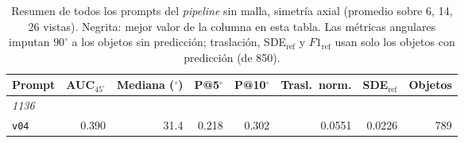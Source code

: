 
\begin{table}[htbp]
\centering
\caption{Resumen de todos los prompts del \textit{pipeline} sin malla, simetría axial (promedio sobre 6, 14, 26 vistas). Negrita: mejor valor de la columna en esta tabla. Las métricas angulares imputan $90^\circ$ a los objetos sin predicción; traslación, SDE$_{\mathrm{ref}}$ y $F1_{\mathrm{ref}}$ usan solo los objetos con predicción (de 850).}
\label{tab:axis_resumen}
\begin{adjustbox}{max width=\textwidth}
\begin{tabular}{lrrrrrrr}
\toprule
Prompt & AUC$_{45^\circ}$ & Mediana ($^\circ$) & P@5$^\circ$ & P@10$^\circ$ & Trasl.\ norm. & SDE$_{\mathrm{ref}}$ & Objetos \\
\midrule
\multicolumn{8}{l}{\textit{1136}} \\
\quad\texttt{v04} & 0.390 & 31.4 & 0.218 & 0.302 & 0.0551 & 0.0226 & 789 \\
\bottomrule
\end{tabular}
\end{adjustbox}
\end{table}
